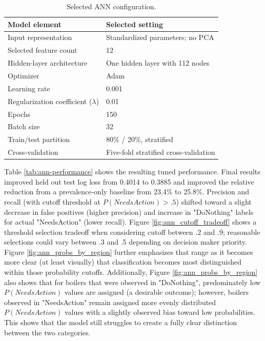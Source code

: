\documentclass[NewProceedings,letterpaper,NoPageNumbers,NoLineNumbers, DoubleSpace]{ascelike-new}
\begin{document}
\begin{table}[htbp]
\centering
\caption{Selected ANN configuration.}
\label{tab:ann-configuration}
\begin{tabular}{ll}
\hline
\textbf{Model element} & \textbf{Selected setting} \\
\hline
Input representation & Standardized parameters; no PCA \\
Selected feature count & 12 \\
Hidden-layer architecture & One hidden layer with 112 nodes \\
Optimizer & Adam \\
Learning rate & 0.001 \\
Regularization coefficient ($\lambda$) & 0.01 \\
Epochs & 150 \\
Batch size & 32 \\
Train/test partition & 80\% / 20\%, stratified \\
Cross-validation & Five-fold stratified cross-validation \\
\hline
\end{tabular}
\end{table}

Table \ref{tab:ann-performance} shows the resulting tuned performance. Final results improved held out test log loss from 0.4014 to 0.3885 and improved the relative reduction from a prevalence-only baseline from 23.4\% to 25.8\%.  Precision and recall (with cutoff threshold at $P(NeedsAction) > .5$) shifted toward a slight decrease in false positives (higher precision) and increase in "DoNothing" labels for actual "NeedsAction" (lower recall). Figure \ref{fig:ann_cutoff_tradeoff} shows a threshold selection tradeoff when considering cutoff between .2 and .9; reasonable selections could vary between .3 and .5 depending on decision maker priority. Figure \ref{fig:ann_probs_by_region} further emphasizes that range as it becomes more clear (at least visually) that classification becomes most distinguished within those probability cutoffs. Additionally, Figure \ref{fig:ann_probs_by_region} also shows that for boilers that were observed in "DoNothing", predominately low $P(NeedsAction)$ values are assigned (a desirable outcome); however, boilers observed in "NeedsAction" remain assigned more evenly distributed $P(NeedsAction)$ values with a slightly observed bias toward low probabilities. This shows that the model still struggles to create a fully clear distinction between the two categories.
\end{document}
